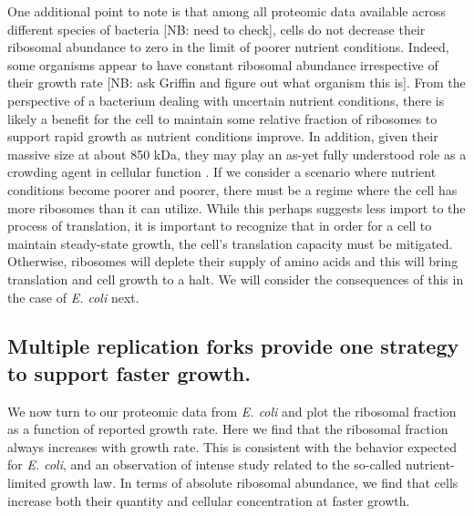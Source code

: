 One additional point to note is that among all proteomic data available across
different species of bacteria [NB: need to check], cells do not decrease their
ribosomal abundance to zero in the limit of poorer nutrient conditions. Indeed,
some organisms appear to have constant ribosomal abundance irrespective of their
growth rate [NB: ask Griffin and figure out what organism this is]. From the
perspective of a bacterium dealing with uncertain nutrient conditions, there is
likely a benefit for the cell to maintain some relative fraction of ribosomes to
support rapid growth as nutrient conditions improve. In addition, given their
massive size at about 850 kDa, they may play an as-yet fully understood role as
a crowding agent in cellular function \cite{delarue2018, solerbistue2020}. If we
consider a scenario where nutrient conditions become poorer and poorer, there
must be a regime where the cell has more ribosomes than it can utilize. While
this perhaps suggests less import to the  process of translation, it is
important to recognize that in order for a cell to maintain steady-state growth,
the cell's translation capacity must be mitigated. Otherwise, ribosomes will
deplete their supply of amino acids and this will bring translation and cell
growth to a halt. We will consider the consequences of this in the case of
\textit{E. coli} next.


\subsection{Multiple replication forks provide one strategy to support faster growth.}


We now turn to our proteomic data from \textit{E. coli} and plot the ribosomal
fraction as a function of reported growth rate. Here we find that the ribosomal
fraction always increases with growth rate. This is consistent with the behavior
expected for \textit{E. coli}, and an observation of intense study related to
the so-called nutrient-limited growth law. In terms of absolute ribosomal
abundance, we find that cells increase both their quantity and cellular
concentration at faster growth.

